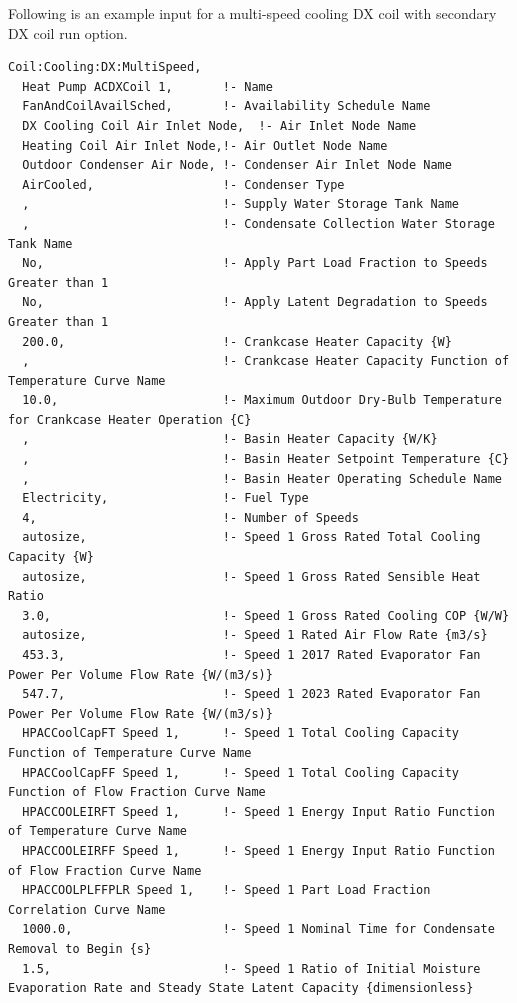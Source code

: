 Following is an example input for a multi-speed cooling DX coil with secondary DX coil run option.

\begin{lstlisting}
Coil:Cooling:DX:MultiSpeed,
  Heat Pump ACDXCoil 1,       !- Name
  FanAndCoilAvailSched,       !- Availability Schedule Name
  DX Cooling Coil Air Inlet Node,  !- Air Inlet Node Name
  Heating Coil Air Inlet Node,!- Air Outlet Node Name
  Outdoor Condenser Air Node, !- Condenser Air Inlet Node Name
  AirCooled,                  !- Condenser Type
  ,                           !- Supply Water Storage Tank Name
  ,                           !- Condensate Collection Water Storage Tank Name
  No,                         !- Apply Part Load Fraction to Speeds Greater than 1
  No,                         !- Apply Latent Degradation to Speeds Greater than 1
  200.0,                      !- Crankcase Heater Capacity {W}
  ,                           !- Crankcase Heater Capacity Function of Temperature Curve Name
  10.0,                       !- Maximum Outdoor Dry-Bulb Temperature for Crankcase Heater Operation {C}
  ,                           !- Basin Heater Capacity {W/K}
  ,                           !- Basin Heater Setpoint Temperature {C}
  ,                           !- Basin Heater Operating Schedule Name
  Electricity,                !- Fuel Type
  4,                          !- Number of Speeds
  autosize,                   !- Speed 1 Gross Rated Total Cooling Capacity {W}
  autosize,                   !- Speed 1 Gross Rated Sensible Heat Ratio
  3.0,                        !- Speed 1 Gross Rated Cooling COP {W/W}
  autosize,                   !- Speed 1 Rated Air Flow Rate {m3/s}
  453.3,                      !- Speed 1 2017 Rated Evaporator Fan Power Per Volume Flow Rate {W/(m3/s)}
  547.7,                      !- Speed 1 2023 Rated Evaporator Fan Power Per Volume Flow Rate {W/(m3/s)}
  HPACCoolCapFT Speed 1,      !- Speed 1 Total Cooling Capacity Function of Temperature Curve Name
  HPACCoolCapFF Speed 1,      !- Speed 1 Total Cooling Capacity Function of Flow Fraction Curve Name
  HPACCOOLEIRFT Speed 1,      !- Speed 1 Energy Input Ratio Function of Temperature Curve Name
  HPACCOOLEIRFF Speed 1,      !- Speed 1 Energy Input Ratio Function of Flow Fraction Curve Name
  HPACCOOLPLFFPLR Speed 1,    !- Speed 1 Part Load Fraction Correlation Curve Name
  1000.0,                     !- Speed 1 Nominal Time for Condensate Removal to Begin {s}
  1.5,                        !- Speed 1 Ratio of Initial Moisture Evaporation Rate and Steady State Latent Capacity {dimensionless}

\end{lstlisting}
